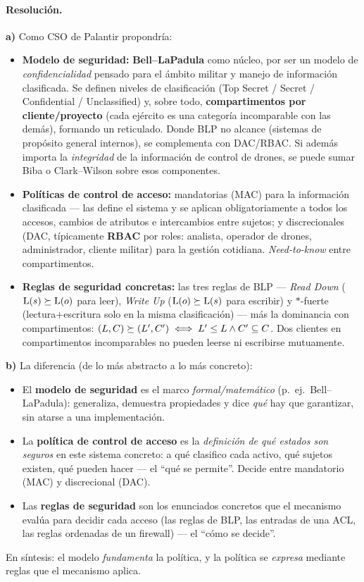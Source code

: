 \paragraph{Resolución.}
\textbf{a)} Como CSO de Palantir propondría:
\begin{itemize}
  \item \textbf{Modelo de seguridad:} \textbf{Bell--LaPadula} como núcleo, por ser un
  modelo de \emph{confidencialidad} pensado para el ámbito militar y manejo de información
  clasificada. Se definen niveles de clasificación (Top Secret / Secret / Confidential /
  Unclassified) y, sobre todo, \textbf{compartimentos por cliente/proyecto} (cada ejército
  es una categoría incomparable con las demás), formando un reticulado. Donde BLP no alcance
  (sistemas de propósito general internos), se complementa con DAC/RBAC. Si además importa
  la \emph{integridad} de la información de control de drones, se puede sumar Biba o
  Clark--Wilson sobre esos componentes.
  \item \textbf{Políticas de control de acceso:} mandatorias (MAC) para la información
  clasificada --- las define el sistema y se aplican obligatoriamente a todos los accesos,
  cambios de atributos e intercambios entre sujetos; y discrecionales (DAC, típicamente
  \textbf{RBAC} por roles: analista, operador de drones, administrador, cliente militar)
  para la gestión cotidiana. \emph{Need-to-know} entre compartimentos.
  \item \textbf{Reglas de seguridad concretas:} las tres reglas de BLP ---
  \emph{Read Down} ($\mathrm{L}(s)\succeq\mathrm{L}(o)$ para leer), \emph{Write Up} ($\mathrm{L}(o)\succeq\mathrm{L}(s)$
  para escribir) y $\ast$-fuerte (lectura+escritura solo en la misma clasificación) ---
  más la dominancia con compartimentos: $(L,C)\succeq(L',C')\iff L'\le L \wedge C'\subseteq C$.
  Dos clientes en compartimentos incomparables no pueden leerse ni escribirse mutuamente.
\end{itemize}

\textbf{b)} La diferencia (de lo más abstracto a lo más concreto):
\begin{itemize}
  \item El \textbf{modelo de seguridad} es el marco \emph{formal/matemático} (p.\ ej.\
  Bell--LaPadula): generaliza, demuestra propiedades y dice \emph{qué} hay que garantizar,
  sin atarse a una implementación.
  \item La \textbf{política de control de acceso} es la \emph{definición de qué estados son
  seguros} en este sistema concreto: a qué clasifico cada activo, qué sujetos existen, qué
  pueden hacer --- el ``qué se permite''. Decide entre mandatorio (MAC) y discrecional (DAC).
  \item Las \textbf{reglas de seguridad} son los enunciados concretos que el mecanismo
  evalúa para decidir cada acceso (las reglas de BLP, las entradas de una ACL, las reglas
  ordenadas de un firewall) --- el ``cómo se decide''.
\end{itemize}
En síntesis: el modelo \emph{fundamenta} la política, y la política se \emph{expresa}
mediante reglas que el mecanismo aplica.

